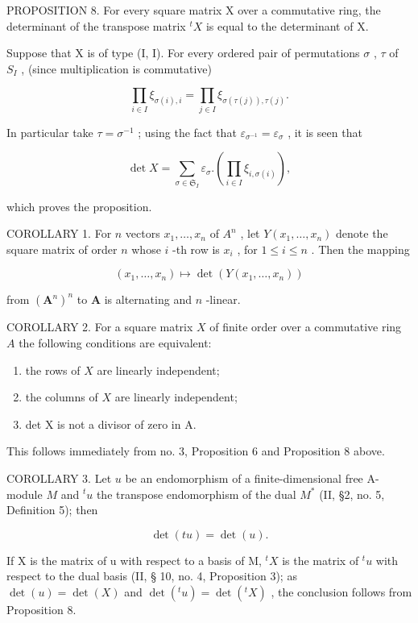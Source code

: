 PROPOSITION 8. For every square matrix X over a commutative ring, the determinant of the transpose matrix \(^{t}X\) is equal to the determinant of X.

Suppose that X is of type (I, I). For every ordered pair of permutations \(\sigma\) , \(\tau\) of \(S_{I}\) , (since multiplication is commutative)

\[
\prod_ {i \in I} \xi_ {\sigma (i), i} = \prod_ {j \in I} \xi_ {\sigma (\tau (j)), \tau (j)}.
\]

In particular take \(\tau = \sigma^{-1}\) ; using the fact that \(\varepsilon_{\sigma^{-1}} = \varepsilon_{\sigma}\) , it is seen that

\[
\det X = \sum_ {\sigma \in \mathfrak {S} _ {I}} \varepsilon_ {\sigma}. \left(\prod_ {i \in I} \xi_ {i, \sigma (i)}\right),\tag{15}
\]

which proves the proposition.

COROLLARY 1. For \(n\) vectors \(x_1, \ldots, x_n\) of \(A^n\) , let \(Y(x_1, \ldots, x_n)\) denote the square matrix of order \(n\) whose \(i\) -th row is \(x_i\) , for \(1 \leqslant i \leqslant n\) . Then the mapping

\[
(x _ {1}, \dots , x _ {n}) \mapsto \det (Y (x _ {1}, \dots , x _ {n}))
\]

from \((\mathbf{A}^n)^n\) to \(\mathbf{A}\) is alternating and \(n\) -linear.

COROLLARY 2. For a square matrix \(X\) of finite order over a commutative ring \(A\) the following conditions are equivalent:

\begin{enumerate}
\def\labelenumi{(\roman{enumi})}
\item
  the rows of \(X\) are linearly independent;
\item
  the columns of \(X\) are linearly independent;
\item
  det X is not a divisor of zero in A.
\end{enumerate}

This follows immediately from no. 3, Proposition 6 and Proposition 8 above.

COROLLARY 3. Let \(u\) be an endomorphism of a finite-dimensional free A-module \(M\) and \({}^t u\) the transpose endomorphism of the dual \(M^*\) (II, §2, no. 5, Definition 5); then

\[
\det (t u) = \det (u).\tag{16}
\]

If X is the matrix of u with respect to a basis of M, \({}^{t}X\) is the matrix of \({}^{t}u\) with respect to the dual basis (II, § 10, no. 4, Proposition 3); as \(\det(u) = \det(X)\) and \(\det(^{t}u) = \det(^{t}X)\) , the conclusion follows from Proposition 8.


